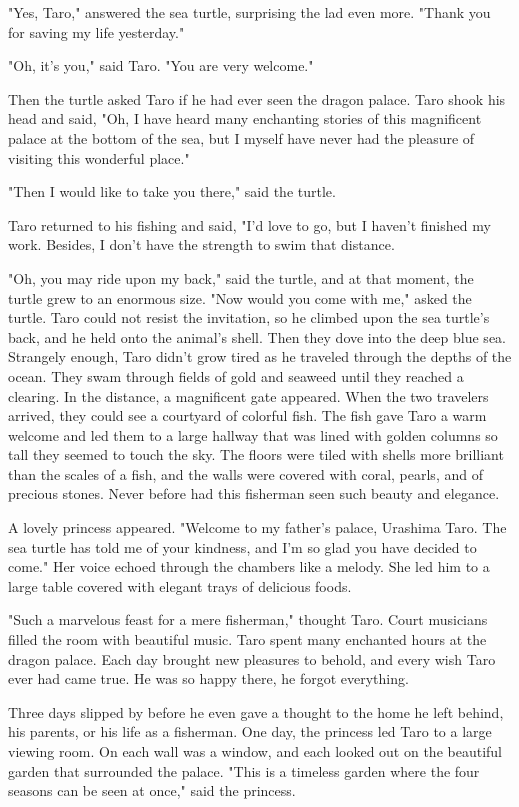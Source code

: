 "Yes, Taro," answered the sea turtle, surprising the lad even more. "Thank you for saving my life yesterday."

"Oh, it's you," said Taro. "You are very welcome."

Then the turtle asked Taro if he had ever seen the dragon palace. Taro shook his head and said, "Oh, I have heard many enchanting stories of this magnificent palace at the bottom of the sea, but I myself have never had the pleasure of visiting this wonderful place."

"Then I would like to take you there," said the turtle.

Taro returned to his fishing and said, "I'd love to go, but I haven't finished my work. Besides, I don't have the strength to swim that distance.

"Oh, you may ride upon my back," said the turtle, and at that moment, the turtle grew to an enormous size. "Now would you come with me," asked the turtle. Taro could not resist the invitation, so he climbed upon the sea turtle's back, and he held onto the animal's shell. Then they dove into the deep blue sea. Strangely enough, Taro didn't grow tired as he traveled through the depths of the ocean. They swam through fields of gold and seaweed until they reached a clearing. In the distance, a magnificent gate appeared. When the two travelers arrived, they could see a courtyard of colorful fish. The fish gave Taro a warm welcome and led them to a large hallway that was lined with golden columns so tall they seemed to touch the sky. The floors were tiled with shells more brilliant than the scales of a fish, and the walls were covered with coral, pearls, and of precious stones. Never before had this fisherman seen such beauty and elegance.

A lovely princess appeared. "Welcome to my father's palace, Urashima Taro. The sea turtle has told me of your kindness, and I'm so glad you have decided to come." Her voice echoed through the chambers like a melody. She led him to a large table covered with elegant trays of delicious foods.

"Such a marvelous feast for a mere fisherman," thought Taro. Court musicians filled the room with beautiful music. Taro spent many enchanted hours at the dragon palace. Each day brought new pleasures to behold, and every wish Taro ever had came true. He was so happy there, he forgot everything.

Three days slipped by before he even gave a thought to the home he left behind, his parents, or his life as a fisherman. One day, the princess led Taro to a large viewing room. On each wall was a window, and each looked out on the beautiful garden that surrounded the palace. "This is a timeless garden where the four seasons can be seen at once," said the princess.

